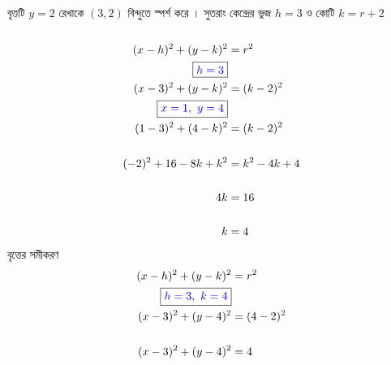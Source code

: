 \documentclass{article}
\begin{document}
	\\ 
বৃত্তটি $y=2$ রেখাকে $(3,2)$ বিন্দুতে স্পর্শ করে । সুতরাং কেন্দ্রের ভুজ $h=3$ ও কোটি $k=r+2$\\
\\ 
	\begin{align*}
		(x-h)^2+(y-k)^2&=r^2\\
			\boxed{\textcolor{blue}{h=3}}&\\ 
		(x-3)^2+(y-k)^2&=(k-2)^2\\
		\boxed{\textcolor{blue}{x=1,\,\,y=4}}&\\ 
		(1-3)^2+(4-k)^2&=(k-2)^2\\
		\\
		(-2)^2+16-8k+k^2&=k^2-4k+4\\
		\\
		4k&=16\\
		\\
		k&=4
	\end{align*}
বৃত্তের সমীকরণ \\ 
	\begin{align*}
	(x-h)^2+(y-k)^2&=r^2\\
	\boxed{\textcolor{blue}{h=3,\,\,k=4}}&\\ 
	(x-3)^2+(y-4)^2&=(4-2)^2\\
	\\
	(x-3)^2+(y-4)^2&=4\\
\end{align*}
\end{document}
